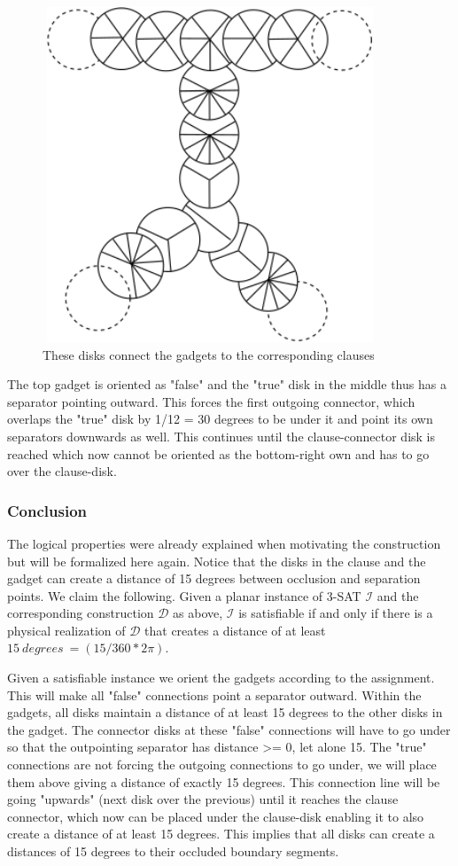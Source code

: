 \documentclass[a4paper,11pt]{article}
\begin{document}
\begin{figure}[h]
\centering
\includegraphics[width=10cm, height=10cm]{assets/np-hardness/full.png}
\caption{These disks connect the gadgets to the corresponding clauses}
\end{figure}

The top gadget is oriented as "false" and the "true" disk in the middle thus has a separator pointing outward. This forces the first outgoing connector, which overlaps the "true" disk by 1/12 = 30 degrees to be under it and point its own separators downwards as well. This continues until the clause-connector disk is reached which now cannot be oriented as the bottom-right own and has to go over the clause-disk.

\subsubsection{Conclusion}
The logical properties were already explained when motivating the construction but will be formalized here again. Notice that the disks in the clause and the gadget can create a distance of 15 degrees between occlusion and separation points. We claim the following.
Given a planar instance of 3-SAT $\mathcal{I}$ and the corresponding construction $\mathcal{D}$ as above, $\mathcal{I}$ is satisfiable if and only if there is a physical realization of $\mathcal{D}$ that creates a distance of at least $15\ degrees\ =  (15/360 * 2\pi)$.

Given a satisfiable instance we orient the gadgets according to the assignment. This will make all "false" connections point a separator outward. Within the gadgets, all disks maintain a distance of at least 15 degrees to the other disks in the gadget. The connector disks at these "false" connections will have to go under so that the outpointing separator has distance >= 0, let alone 15. The "true" connections are not forcing the outgoing connections to go under, we will place them above giving a distance of exactly 15 degrees. This connection line will be going "upwards" (next disk over the previous) until it reaches the clause connector, which now can be placed under the clause-disk enabling it to also create a distance of at least 15 degrees.
This implies that all disks can create a distances of 15 degrees to their occluded boundary segments.
\end{document}
